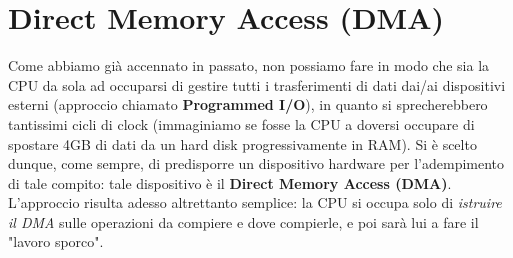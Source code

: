 \documentclass[12pt]{report}
\begin{document}
	\section{Direct Memory Access (DMA)}
	Come abbiamo già accennato in passato, non possiamo fare in modo che sia la CPU da sola ad occuparsi di gestire tutti i trasferimenti di dati dai/ai dispositivi esterni (approccio chiamato \textbf{Programmed I/O}), in quanto si sprecherebbero tantissimi cicli di clock (immaginiamo se fosse la CPU a doversi occupare di spostare 4GB di dati da un hard disk progressivamente in RAM). Si è scelto dunque, come sempre, di predisporre un dispositivo hardware per l'adempimento di tale compito: tale dispositivo è il \textbf{Direct Memory Access (DMA)}.\\
	L'approccio risulta adesso altrettanto semplice: la CPU si occupa solo di \textit{istruire il DMA} sulle operazioni da compiere e dove compierle, e poi sarà lui a fare il "lavoro sporco".
\end{document}
